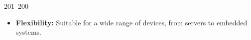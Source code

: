 201~200~\documentclass{article}
\begin{document}
\begin{itemize}
	                                                                                                                                                                                                                                                                                                	                                                                                                                                        	    	                                                                                                	                                                                                                                                                                                                                                                                                                                                	                                                                        	                                                                        	                                                                                                                                        	                                                                                                                                                                                                                        	                                                                                                                            	                                                                	                                                                                                                                                                                                            \item \textbf{Flexibility:} Suitable for a wide range of devices, from servers to embedded systems.

\end{itemize}
\end{document}

